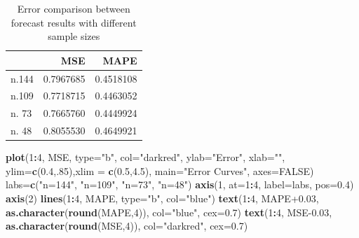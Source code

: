 \documentclass[
]{book}
\newenvironment{Shaded}{\begin{snugshade}}{\end{snugshade}}
\newcommand{\AttributeTok}[1]{\textcolor[rgb]{0.13,0.29,0.53}{#1}}
\newcommand{\ConstantTok}[1]{\textcolor[rgb]{0.56,0.35,0.01}{#1}}
\newcommand{\DecValTok}[1]{\textcolor[rgb]{0.00,0.00,0.81}{#1}}
\newcommand{\FloatTok}[1]{\textcolor[rgb]{0.00,0.00,0.81}{#1}}
\newcommand{\FunctionTok}[1]{\textcolor[rgb]{0.13,0.29,0.53}{\textbf{#1}}}
\newcommand{\NormalTok}[1]{#1}
\newcommand{\OtherTok}[1]{\textcolor[rgb]{0.56,0.35,0.01}{#1}}
\newcommand{\SpecialCharTok}[1]{\textcolor[rgb]{0.81,0.36,0.00}{\textbf{#1}}}
\newcommand{\StringTok}[1]{\textcolor[rgb]{0.31,0.60,0.02}{#1}}
\begin{document}
\begin{table}

\caption{\label{tab:unnamed-chunk-233}Error comparison between forecast results with different sample sizes}
\centering
\begin{tabular}[t]{l|r|r}
\hline
  & MSE & MAPE\\
\hline
n.144 & 0.7967685 & 0.4518108\\
\hline
n.109 & 0.7718715 & 0.4463052\\
\hline
n. 73 & 0.7665760 & 0.4449924\\
\hline
n. 48 & 0.8055530 & 0.4649921\\
\hline
\end{tabular}
\end{table}

\newpage

\begin{Shaded}
\begin{Highlighting}[]
\FunctionTok{plot}\NormalTok{(}\DecValTok{1}\SpecialCharTok{:}\DecValTok{4}\NormalTok{, MSE, }\AttributeTok{type=}\StringTok{"b"}\NormalTok{, }\AttributeTok{col=}\StringTok{"darkred"}\NormalTok{, }\AttributeTok{ylab=}\StringTok{"Error"}\NormalTok{, }\AttributeTok{xlab=}\StringTok{""}\NormalTok{,}
     \AttributeTok{ylim=}\FunctionTok{c}\NormalTok{(}\FloatTok{0.4}\NormalTok{,.}\DecValTok{85}\NormalTok{),}\AttributeTok{xlim =} \FunctionTok{c}\NormalTok{(}\FloatTok{0.5}\NormalTok{,}\FloatTok{4.5}\NormalTok{), }\AttributeTok{main=}\StringTok{"Error Curves"}\NormalTok{, }\AttributeTok{axes=}\ConstantTok{FALSE}\NormalTok{)}
\NormalTok{labs}\OtherTok{=}\FunctionTok{c}\NormalTok{(}\StringTok{"n=144"}\NormalTok{, }\StringTok{"n=109"}\NormalTok{, }\StringTok{"n=73"}\NormalTok{, }\StringTok{"n=48"}\NormalTok{)}
\FunctionTok{axis}\NormalTok{(}\DecValTok{1}\NormalTok{, }\AttributeTok{at=}\DecValTok{1}\SpecialCharTok{:}\DecValTok{4}\NormalTok{, }\AttributeTok{label=}\NormalTok{labs, }\AttributeTok{pos=}\FloatTok{0.4}\NormalTok{)}
\FunctionTok{axis}\NormalTok{(}\DecValTok{2}\NormalTok{)}
\FunctionTok{lines}\NormalTok{(}\DecValTok{1}\SpecialCharTok{:}\DecValTok{4}\NormalTok{, MAPE, }\AttributeTok{type=}\StringTok{"b"}\NormalTok{, }\AttributeTok{col=}\StringTok{"blue"}\NormalTok{)}
\FunctionTok{text}\NormalTok{(}\DecValTok{1}\SpecialCharTok{:}\DecValTok{4}\NormalTok{, MAPE}\FloatTok{+0.03}\NormalTok{, }\FunctionTok{as.character}\NormalTok{(}\FunctionTok{round}\NormalTok{(MAPE,}\DecValTok{4}\NormalTok{)), }\AttributeTok{col=}\StringTok{"blue"}\NormalTok{, }\AttributeTok{cex=}\FloatTok{0.7}\NormalTok{)}
\FunctionTok{text}\NormalTok{(}\DecValTok{1}\SpecialCharTok{:}\DecValTok{4}\NormalTok{, MSE}\FloatTok{{-}0.03}\NormalTok{, }\FunctionTok{as.character}\NormalTok{(}\FunctionTok{round}\NormalTok{(MSE,}\DecValTok{4}\NormalTok{)), }\AttributeTok{col=}\StringTok{"darkred"}\NormalTok{, }\AttributeTok{cex=}\FloatTok{0.7}\NormalTok{)}

\end{Highlighting}
\end{Shaded}
\end{document}
